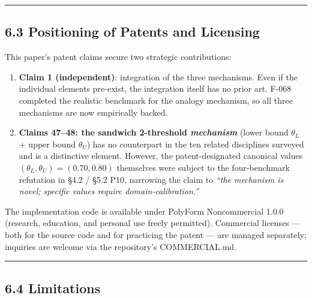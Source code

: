 \begin{center}\rule{0.5\linewidth}{0.5pt}\end{center}

\subsection{6.3 Positioning of Patents and Licensing}\label{positioning-of-patents-and-licensing}

This paper's patent claims secure two strategic contributions:

\begin{enumerate}
\def\labelenumi{\arabic{enumi}.}
\tightlist
\item
  \textbf{Claim 1 (independent)}: integration of the three mechanisms. Even if the individual elements pre-exist, the integration itself has no prior art. F-068 completed the realistic benchmark for the analogy mechanism, so all three mechanisms are now empirically backed.
\item
  \textbf{Claims 47--48: the sandwich 2-threshold \emph{mechanism}} (lower bound \(\theta_L\) + upper bound \(\theta_U\)) has no counterpart in the ten related disciplines surveyed and is a distinctive element. However, the patent-designated canonical values \((\theta_L, \theta_U) = (0.70, 0.80)\) themselves were subject to the four-benchmark refutation in §4.2 / §5.2 P10, narrowing the claim to \emph{``the mechanism is novel; specific values require domain-calibration.''}
\end{enumerate}

The implementation code is available under PolyForm Noncommercial 1.0.0 (research, education, and personal use freely permitted). Commercial licenses --- both for the source code and for practicing the patent --- are managed separately; inquiries are welcome via the repository's COMMERCIAL.md.

\begin{center}\rule{0.5\linewidth}{0.5pt}\end{center}

\subsection{6.4 Limitations}\label{limitations}

